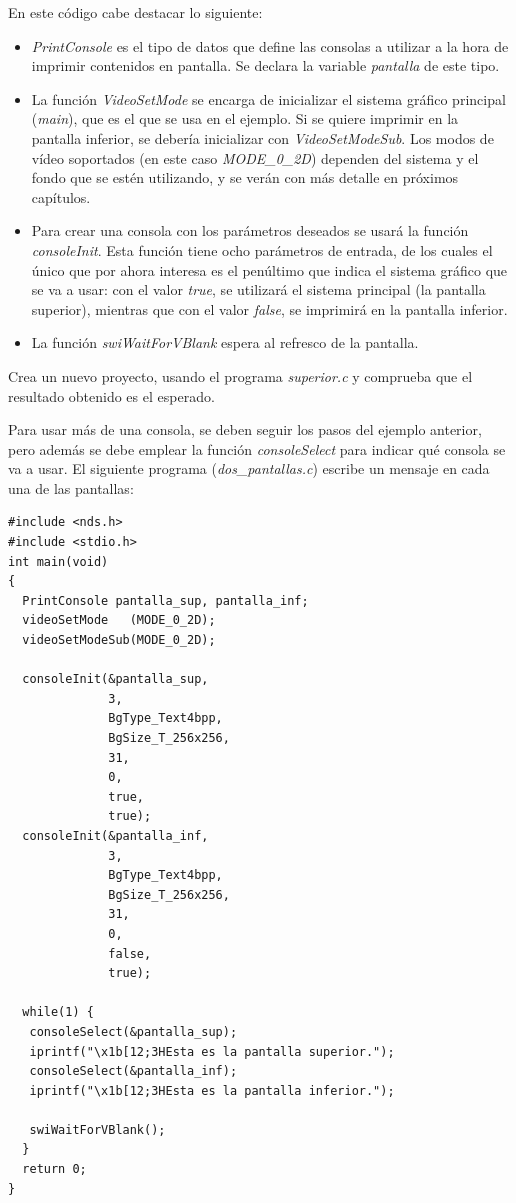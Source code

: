 En este código cabe destacar lo siguiente:
\begin{itemize}
\item \textit{PrintConsole} es el tipo de datos que define las consolas a utilizar a la hora de imprimir contenidos en pantalla. Se declara la variable \textit{pantalla} de este tipo.
%    
\item La función \textit{VideoSetMode} se encarga de inicializar el sistema gráfico principal (\textit{main}), que es el que se usa en el ejemplo. Si se quiere imprimir en la pantalla inferior, se debería inicializar con \textit{VideoSetModeSub}. Los modos de vídeo soportados (en este caso \textit{MODE\_0\_2D})  dependen del sistema y el fondo que se estén utilizando, y se verán con más detalle en próximos capítulos.
%
\item Para crear una consola con los parámetros deseados se usará la función \textit{consoleInit}. Esta función tiene ocho parámetros de entrada, de los cuales el único que por ahora interesa es el penúltimo que indica el sistema gráfico que se va a usar: con el valor \textit{true}, se utilizará el sistema principal (la pantalla superior), mientras que con el valor \textit{false}, se imprimirá en la pantalla inferior.  \item La función \textit{swiWaitForVBlank} espera al refresco de la pantalla.
\end{itemize}

\begin{exercise}
Crea un nuevo proyecto, usando el programa \textit{superior.c} y comprueba que el resultado obtenido es el esperado.
\end{exercise}

Para usar más de una consola, se deben seguir los pasos del ejemplo anterior, pero además se debe emplear la función \textit{consoleSelect} para indicar qué consola se va a usar. El siguiente programa (\textit{dos\_pantallas.c}) escribe un mensaje en cada una de las pantallas:

\begin{lstlisting}
#include <nds.h>
#include <stdio.h>
int main(void)
{
  PrintConsole pantalla_sup, pantalla_inf;  
  videoSetMode   (MODE_0_2D);
  videoSetModeSub(MODE_0_2D);
  
  consoleInit(&pantalla_sup, 
              3, 
              BgType_Text4bpp,
              BgSize_T_256x256, 
              31, 
              0,
              true, 
              true);
  consoleInit(&pantalla_inf,
              3,
              BgType_Text4bpp,
              BgSize_T_256x256,
              31,
              0,
              false,
              true);

  while(1) {  
   consoleSelect(&pantalla_sup);
   iprintf("\x1b[12;3HEsta es la pantalla superior.");
   consoleSelect(&pantalla_inf);
   iprintf("\x1b[12;3HEsta es la pantalla inferior.");

   swiWaitForVBlank();
  }
  return 0;
}
\end{lstlisting}


